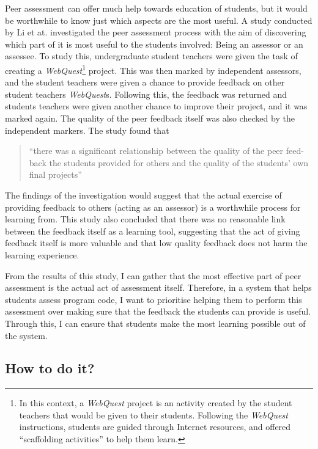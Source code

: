 \documentclass[a4paper,11pt]{report}
\begin{document}
Peer assessment can offer much help towards education of students, but it would be worthwhile to know just which aspects are the most useful. A study conducted by Li et at. \cite{li_assessor_2010} investigated the peer assessment process with the aim of discovering which part of it is most useful to the students involved: Being an assessor or an assessee. To study this, undergraduate student teachers were given the task of creating a \textit{WebQuest}\footnote{In this context, a \textit{WebQuest} project is an activity created by the student teachers that would be given to their students. Following the \textit{WebQuest} instructions, students are guided through Internet resources, and offered ``scaffolding activities'' to help them learn.} project. This was then marked by independent assessors, and the student teachers were given a chance to provide feedback on other student teachers \textit{WebQuest}s. Following this, the feedback was returned and students teachers were given another chance to improve their project, and it was marked again. The quality of the peer feedback itself was also checked by the independent markers. The study found that 
\begin{quote}
``there was a significant relationship between the quality of the peer feed-back the students provided for others and the quality of the students' own final projects''
\end{quote}
The findings of the investigation would suggest that the actual exercise of providing feedback to others (acting as an assessor) is a worthwhile process for learning from. This study also concluded that there was no reasonable link between the feedback itself as a learning tool, suggesting that the act of giving feedback itself is more valuable and that low quality feedback does not harm the learning experience.\par
From the results of this study, I can gather that the most effective part of peer assessment is the actual act of assessment itself. Therefore, in a system that helps students assess program code, I want to prioritise helping them to perform this assessment over making sure that the feedback the students can provide is useful. Through this, I can ensure that students make the most learning possible out of the system.


\subsection{How to do it?}
\end{document}
